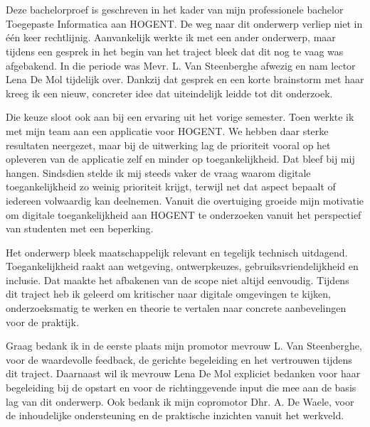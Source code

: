 
\chapter*{}%
\label{ch:voorwoord}


Deze bachelorproef is geschreven in het kader van mijn professionele bachelor Toegepaste Informatica aan HOGENT. De weg naar dit onderwerp verliep niet in één keer rechtlijnig. Aanvankelijk werkte ik met een ander onderwerp, maar tijdens een gesprek in het begin van het traject bleek dat dit nog te vaag was afgebakend. In die periode was Mevr. L. Van Steenberghe afwezig en nam lector Lena De Mol tijdelijk over. Dankzij dat gesprek en een korte brainstorm met haar kreeg ik een nieuw, concreter idee dat uiteindelijk leidde tot dit onderzoek.

Die keuze sloot ook aan bij een ervaring uit het vorige semester. Toen werkte ik met mijn team aan een applicatie voor HOGENT. We hebben daar sterke resultaten neergezet, maar bij de uitwerking lag de prioriteit vooral op het opleveren van de applicatie zelf en minder op toegankelijkheid. Dat bleef bij mij hangen. Sindsdien stelde ik mij steeds vaker de vraag waarom digitale toegankelijkheid zo weinig prioriteit krijgt, terwijl net dat aspect bepaalt of iedereen volwaardig kan deelnemen. Vanuit die overtuiging groeide mijn motivatie om digitale toegankelijkheid aan HOGENT te onderzoeken vanuit het perspectief van studenten met een beperking.

Het onderwerp bleek maatschappelijk relevant en tegelijk technisch uitdagend. Toegankelijkheid raakt aan wetgeving, ontwerpkeuzes, gebruiksvriendelijkheid en inclusie. Dat maakte het afbakenen van de scope niet altijd eenvoudig. Tijdens dit traject heb ik geleerd om kritischer naar digitale omgevingen te kijken, onderzoeksmatig te werken en theorie te vertalen naar concrete aanbevelingen voor de praktijk.

Graag bedank ik in de eerste plaats mijn promotor mevrouw L. Van Steenberghe, voor de waardevolle feedback, de gerichte begeleiding en het vertrouwen tijdens dit traject. Daarnaast wil ik mevrouw Lena De Mol expliciet bedanken voor haar begeleiding bij de opstart en voor de richtinggevende input die mee aan de basis lag van dit onderwerp. Ook bedank ik mijn copromotor Dhr. A. De Waele, voor de inhoudelijke ondersteuning en de praktische inzichten vanuit het werkveld.

